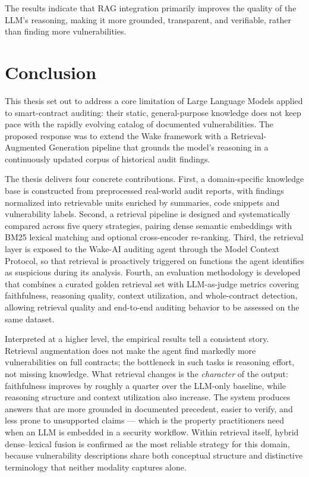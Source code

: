 The results indicate that RAG integration primarily improves the quality of the LLM's reasoning, making it more grounded, transparent, and verifiable, rather than finding more vulnerabilities.


\chapter{Conclusion}
\label{ch:conclusion}

This thesis set out to address a core limitation of Large Language Models applied to smart-contract auditing: their static, general-purpose knowledge does not keep pace with the rapidly evolving catalog of documented vulnerabilities. The proposed response was to extend the Wake framework with a Retrieval-Augmented Generation pipeline that grounds the model's reasoning in a continuously updated corpus of historical audit findings.

The thesis delivers four concrete contributions. First, a domain-specific knowledge base is constructed from preprocessed real-world audit reports, with findings normalized into retrievable units enriched by summaries, code snippets and vulnerability labels. Second, a retrieval pipeline is designed and systematically compared across five query strategies, pairing dense semantic embeddings with BM25 lexical matching and optional cross-encoder re-ranking. Third, the retrieval layer is exposed to the Wake-AI auditing agent through the Model Context Protocol, so that retrieval is proactively triggered on functions the agent identifies as suspicious during its analysis. Fourth, an evaluation methodology is developed that combines a curated golden retrieval set with LLM-as-judge metrics covering faithfulness, reasoning quality, context utilization, and whole-contract detection, allowing retrieval quality and end-to-end auditing behavior to be assessed on the same dataset.

Interpreted at a higher level, the empirical results tell a consistent story. Retrieval augmentation does not make the agent find markedly more vulnerabilities on full contracts; the bottleneck in such tasks is reasoning effort, not missing knowledge. What retrieval changes is the \emph{character} of the output: faithfulness improves by roughly a quarter over the LLM-only baseline, while reasoning structure and context utilization also increase. The system produces answers that are more grounded in documented precedent, easier to verify, and less prone to unsupported claims --- which is the property practitioners need when an LLM is embedded in a security workflow. Within retrieval itself, hybrid dense--lexical fusion is confirmed as the most reliable strategy for this domain, because vulnerability descriptions share both conceptual structure and distinctive terminology that neither modality captures alone.

